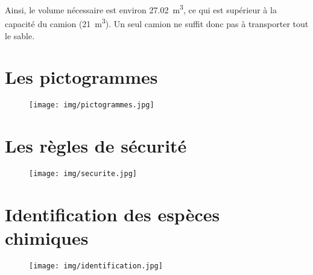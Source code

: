 \documentclass[a4paper,12pt]{article}
\begin{document}
Ainsi, le volume nécessaire est environ \SI{27.02}{m^3}, ce qui est supérieur à la capacité du camion (\SI{21}{m^3}). Un seul camion ne suffit donc pas à transporter tout le sable.


\section{Les pictogrammes}

\begin{figure}[H]
  \centering
  \texttt{[image: img/pictogrammes.jpg]}
  \label{Les pictogrammes}
\end{figure}

\section{Les règles de sécurité}

\begin{figure}[H]
  \centering
  \texttt{[image: img/securite.jpg]}
  \label{Les règles de sécurité}
\end{figure}

\section{Identification des espèces chimiques}

\begin{figure}[H]
  \centering
  \texttt{[image: img/identification.jpg]}
  \label{Identification d'espèces chimiques}
\end{figure}
\end{document}
